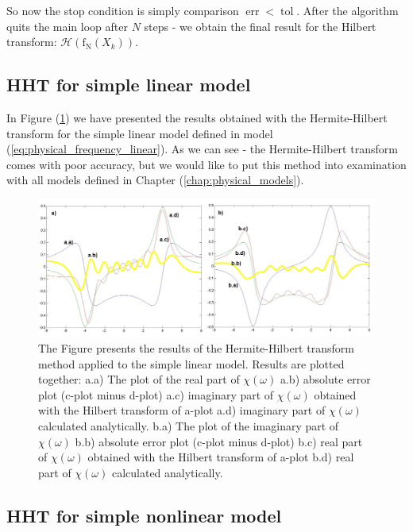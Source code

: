 \documentclass[12pt,twoside,a4paper]{article}
\numberwithin{equation}{subsection}
\numberwithin{figure}{subsection}
\begin{document}
So now the stop condition is simply comparison $\mathop{\mathrm{err}}  < \mathop{\mathrm{tol}} $. After the algorithm quits the main loop after $N$ steps - we obtain the final result for the Hilbert transform: $\mathcal{H} (\mathrm{f_N}(X_k))$.

\subsection{HHT for simple linear model} \label{chap:hermite_lin}

In Figure (\ref{fig:hht_lin}) we have presented the results obtained with the Hermite-Hilbert transform for the simple linear model defined in model (\ref{eq:physical_frequency_linear}). As we can see - the Hermite-Hilbert transform comes with poor accuracy, but we would like to put this method into examination with all models defined in Chapter (\ref{chap:physical_models}).

\begin{figure} 
  \includegraphics[width=150mm]{img/hht_lin.png}
  \caption{ The Figure presents the results of the Hermite-Hilbert transform method applied to the simple linear model. Results are plotted together: 
   a.a) The plot of the real part of $\chi (\omega )$ 
   a.b) absolute error plot (c-plot minus d-plot) 
   a.c) imaginary part of $\chi (\omega )$ obtained with the Hilbert transform of a-plot 
   a.d) imaginary part of $\chi (\omega )$  calculated analytically. 
   b.a) The plot of the imaginary part of $\chi (\omega )$ 
   b.b) absolute error plot (c-plot minus d-plot) 
   b.c) real part of $\chi (\omega )$ obtained with the Hilbert transform of a-plot 
   b.d) real part of $\chi (\omega )$ calculated analytically. \label{fig:hht_lin}
  }
\end{figure}

\subsection{HHT for simple nonlinear model} \label{chap:hermite_nlo}
\end{document}
